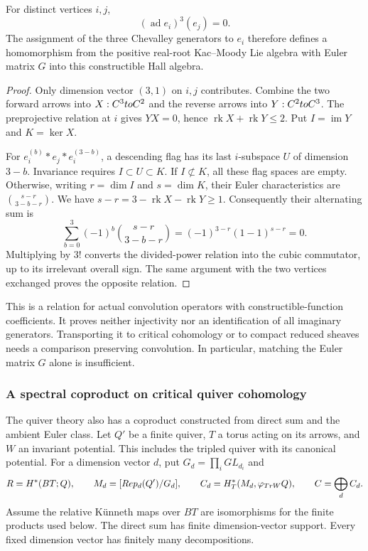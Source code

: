 \begin{theorem}
\label{hall:thm:constructible-serre}
For distinct vertices $i,j$,
\[
 (\operatorname{ad}e_i)^3(e_j)=0.
\]
The assignment of the three Chevalley generators to $e_i$
therefore defines a homomorphism from the positive real-root
Kac--Moody Lie algebra with Euler matrix $G$ into this
constructible Hall algebra.
\end{theorem}

\begin{proof}
Only dimension vector $(3,1)$ on $i,j$ contributes. Combine
the two forward arrows into $X:C^3toC^2$ and the reverse
arrows into $Y:C^2toC^3$. The preprojective relation at
$i$ gives $YX=0$, hence
$\operatorname{rk}X+\operatorname{rk}Y\leq2$.
Put $I=\operatorname{im}Y$ and $K=\ker X$.

For $e_i^{(b)}*e_j*e_i^{(3-b)}$, a descending flag has its last
$i$-subspace $U$ of dimension $3-b$. Invariance requires
$I\subset U\subset K$. If $I\not\subset K$, all these flag
spaces are empty. Otherwise, writing $r=\dim I$ and $s=\dim K$,
their Euler characteristics are
$\binom{s-r}{3-b-r}$. We have
$s-r=3-\operatorname{rk}X-\operatorname{rk}Y\geq1$.
Consequently their alternating sum is
\[
 \sum_{b=0}^3(-1)^b\binom{s-r}{3-b-r}
 =(-1)^{3-r}(1-1)^{s-r}=0.
\]
Multiplying by $3!$ converts the divided-power relation into
the cubic commutator, up to its irrelevant overall sign.
The same argument with the two vertices exchanged proves the
opposite relation.
\end{proof}

This is a relation for actual convolution operators with
constructible-function coefficients. It proves neither
injectivity nor an identification of all imaginary generators.
Transporting it to critical cohomology or to compact reduced
sheaves needs a comparison preserving convolution. In particular,
matching the Euler matrix $G$ alone is insufficient.

\subsubsection*{A spectral coproduct on critical quiver cohomology}

The quiver theory also has a coproduct constructed from direct
sum and the ambient Euler class. Let $Q'$ be a finite quiver,
$T$ a torus acting on its arrows, and $W$ an invariant potential.
This includes the tripled quiver with its canonical potential.
For a dimension vector $d$, put $G_d=\prod_iGL_{d_i}$ and
\[
 R=H^*(BT;Q),\qquad
 M_d=[Rep_d(Q')/G_d],\qquad
 C_d=H_T^*(M_d,\varphi_{TrW}Q),\qquad
 C=\bigoplus_d C_d.
\]
Assume the relative K\"unneth maps over $BT$ are isomorphisms
for the finite products used below. The direct sum has finite
dimension-vector support. Every fixed dimension vector has
finitely many decompositions.

